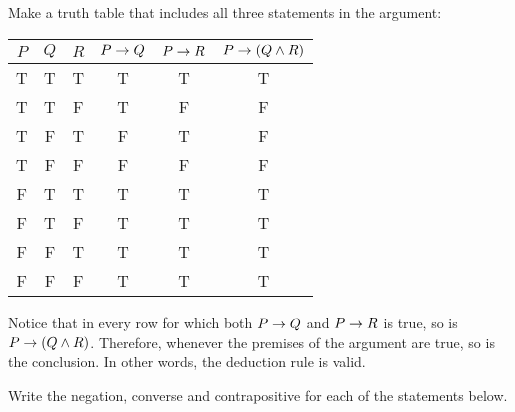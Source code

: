 \begin{questions}
  \begin{answer}
    Make a truth table that includes all three statements in the argument:
    
    \begin{tabular}{c|c|c||c|c|c}
     $P$ & $Q$ & $R$ & $P \rightarrow Q$ & $P \rightarrow R$ & $P \rightarrow (Q \wedge R)$ \\ \hline
      T  &  T  &  T  &      T     &      T     &   T \\
      T  &  T  &  F  &      T     &      F     &   F \\
      T  &  F  &  T  &      F     &      T     &   F \\
      T  &  F  &  F  &      F     &      F     &   F \\
      F  &  T  &  T  &      T     &      T     &   T \\
      F  &  T  &  F  &      T     &      T     &   T \\
      F  &  F  &  T  &      T     &      T     &   T \\
      F  &  F  &  F  &      T     &      T     &   T 
    \end{tabular}
  
  Notice that in every row for which both $P \rightarrow Q$ and $P \rightarrow R$ is true, so is $P \rightarrow (Q \wedge R)$.  Therefore, whenever the premises of the argument are true, so is the conclusion.  In other words, the deduction rule is valid.
  \end{answer}



\question Write the negation, converse and contrapositive for each of the statements below.
\end{questions}
